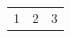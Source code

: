 \documentclass[11pt]{article}
\author{root}
\date{\today}
\title{}
\begin{document}
\tableofcontents

\begin{center}
\begin{tabular}{|r|rr|}
1 & 2 & 3\\[0pt]
\end{tabular}
\end{center}
\end{document}
